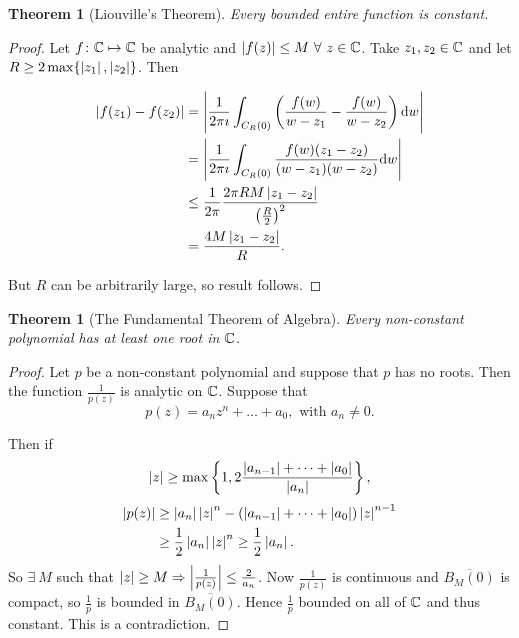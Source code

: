 \documentclass{notes}
\theoremstyle{plain}
\newtheorem{theorem}[proposition]{Theorem}
\begin{document}
\begin{theorem}[Liouville's Theorem]%
Every bounded entire function is constant.
\end{theorem}

\begin{proof}
  Let $f \colon \mathbb{C} \mapsto \mathbb{C}$ be analytic and $\abs{f(z)} \le M\ 
  \forall\ z \in \C$.  Take $z_1, z_2 \in \mathbb{C}$ and let $R \ge 2 \max \{
  \left|z_1\right|, \left|z_2\right| \}$.  Then

\begin{align*}
\left|f(z_1) - f(z_2)\right| &=
\left|\frac{1}{2 \pi \imath} \int_{C_R(0)} \left(
\frac{f(w)}{w-z_1} - \frac{f(w)}{w-z_2}
\right) \mathrm{d} w\right| \\
&= \left|\frac{1}{2 \pi \imath} \int_{C_R(0)} \frac{f(w)(z_1 - z_2)}{(w-z_1)
(w-z_2)} \mathrm{d} w\right| \\
&\le \frac{1}{2 \pi} \frac{2 \pi R M \left|z_1 - z_2\right|}{\left(\frac{R}{2}
\right)^2} \\
&= \frac{4 M \left|z_1 - z_2\right|}{R}.
\end{align*}

But $R$ can be arbitrarily large, so result follows.
\end{proof}

\begin{theorem}[The Fundamental Theorem of Algebra]
   Every non-constant polynomial
  has at least one root in $\mathbb{C}$.
\end{theorem}

\begin{proof}
  Let $p$ be a non-constant polynomial and suppose that $p$ has no
  roots.  Then the function $\frac{1}{p(z)}$ is analytic on $\mathbb{C}$.
  Suppose that
\[
p(z) = a_n z^n + \dots + a_0, \text{ with } a_n \neq 0.
\]

Then if
\[
\left|z\right| \ge
\max \left\{ 1 , 2 \frac{ \left|a_{n-1}\right| + \dots + \left|a_0\right| }{ \left|a_n\right| }
\right\}, \]
\begin{align*}
\left|p(z)\right| &\ge \left|a_n\right| \left|z\right|^n - \left(\left|a_{n-1}\right| + \dots + \left|a_0\right|
\right) \left|z\right|^{n-1} \\
&\ge \frac{1}{2} \left|a_n\right| \left|z\right|^n \ge \frac{1}{2} \left|a_n\right|.
\end{align*}
So $\exists\ M$ such that $\left|z\right| \ge M \Rightarrow \left|\frac{1}{p(z)}\right|
\le \frac{2}{a_n}$.  Now $\frac{1}{p(z)}$ is continuous and
$\overline{B_M(0)}$ is compact, so $\frac{1}{p}$ is bounded in
$\overline{B_M(0)}$.  Hence $\frac{1}{p}$ bounded on all of $\mathbb{C}$ and thus
constant.  This is a contradiction.
\end{proof}
\end{document}
